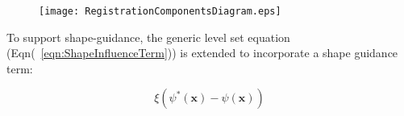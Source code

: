 \documentclass{InsightArticle}
\begin{document}
%
%

\begin{figure}
\center
\texttt{[image: RegistrationComponentsDiagram.eps]}
\label{fig:RegistrationComponents}
\end{figure}



%
%


To support shape-guidance, the generic level set equation
(Eqn(~\ref{eqn:ShapeInfluenceTerm})) is extended to incorporate a shape guidance
term:

\begin{equation}
\label{eqn:ShapeInfluenceTerm}
\xi \left(\psi^{*}(\mathbf{x}) - \psi(\mathbf{x})\right)
\end{equation}




%
%
\nocite{*} %


\end{document}
